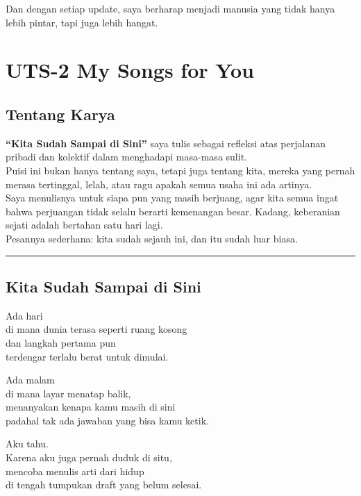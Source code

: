 \documentclass[
  letterpaper,
  DIV=11,
  numbers=noendperiod]{scrreprt}
\begin{document}
Dan dengan setiap update, saya berharap menjadi manusia yang tidak hanya
lebih pintar, tapi juga lebih hangat.


\chapter{UTS-2 My Songs for You}\label{uts-2-my-songs-for-you}

\section{\texorpdfstring{\textbf{Tentang
Karya}}{Tentang Karya}}\label{tentang-karya}

\textbf{``Kita Sudah Sampai di Sini''} saya tulis sebagai refleksi atas
perjalanan pribadi dan kolektif dalam menghadapi masa-masa sulit.\\
Puisi ini bukan hanya tentang saya, tetapi juga tentang kita, mereka
yang pernah merasa tertinggal, lelah, atau ragu apakah semua usaha ini
ada artinya.\\
Saya menulisnya untuk siapa pun yang masih berjuang, agar kita semua
ingat bahwa perjuangan tidak selalu berarti kemenangan besar. Kadang,
keberanian sejati adalah bertahan satu hari lagi.\\
Pesannya sederhana: kita sudah sejauh ini, dan itu sudah luar biasa.

\begin{center}\rule{0.5\linewidth}{0.5pt}\end{center}

\section{\texorpdfstring{\textbf{Kita Sudah Sampai di
Sini}}{Kita Sudah Sampai di Sini}}\label{kita-sudah-sampai-di-sini}

Ada hari\\
di mana dunia terasa seperti ruang kosong\\
dan langkah pertama pun\\
terdengar terlalu berat untuk dimulai.

Ada malam\\
di mana layar menatap balik,\\
menanyakan kenapa kamu masih di sini\\
padahal tak ada jawaban yang bisa kamu ketik.

Aku tahu.\\
Karena aku juga pernah duduk di situ,\\
mencoba menulis arti dari hidup\\
di tengah tumpukan draft yang belum selesai.
\end{document}
